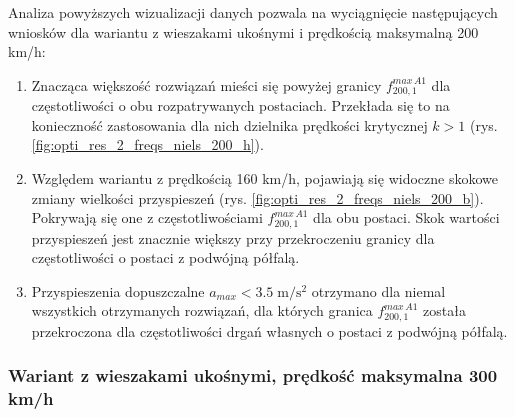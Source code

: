Analiza powyższych wizualizacji danych pozwala na wyciągnięcie następujących wniosków dla wariantu z wieszakami ukośnymi i prędkością maksymalną 200 km/h:
\begin{enumerate}

\item Znacząca większość rozwiązań mieści się powyżej granicy $f_{200,1}^{max\,A1}$ dla częstotliwości o obu rozpatrywanych postaciach. Przekłada się to na konieczność zastosowania dla nich dzielnika prędkości krytycznej $k>1$ (rys. \ref{fig:opti_res_2_freqs_niels_200_h}).

\item Względem wariantu z prędkością 160 km/h, pojawiają się widoczne skokowe zmiany wielkości przyspieszeń (rys. \ref{fig:opti_res_2_freqs_niels_200_b}). Pokrywają się one z częstotliwościami $f_{200,1}^{max\,A1}$ dla obu postaci. Skok wartości przyspieszeń jest znacznie większy przy przekroczeniu granicy dla częstotliwości o postaci z podwójną półfalą.

\item Przyspieszenia dopuszczalne $a_{max}<3.5\;\mathrm{m/s^2}$ otrzymano dla niemal wszystkich otrzymanych rozwiązań, dla których granica $f_{200,1}^{max\,A1}$ została przekroczona dla częstotliwości drgań własnych o postaci z podwójną półfalą.

\end{enumerate}



\subsubsection{Wariant z wieszakami ukośnymi, prędkość maksymalna 300 km/h}

\begin{figure}[H]
	\centering
\end{figure}

